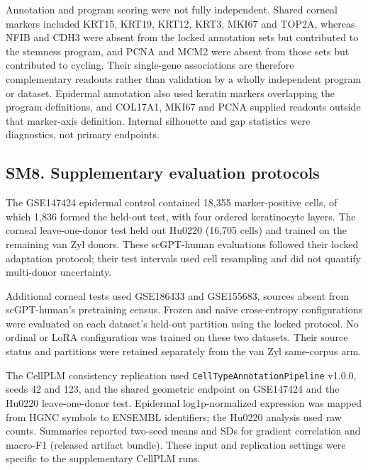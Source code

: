 \documentclass[12pt,a4paper]{article}
\begin{document}
Annotation and program scoring were not fully independent. Shared corneal markers included KRT15, KRT19, KRT12, KRT3, MKI67 and TOP2A, whereas NFIB and CDH3 were absent from the locked annotation sets but contributed to the stemness program, and PCNA and MCM2 were absent from those sets but contributed to cycling. Their single-gene associations are therefore complementary readouts rather than validation by a wholly independent program or dataset. Epidermal annotation also used keratin markers overlapping the program definitions, and COL17A1, MKI67 and PCNA supplied readouts outside that marker-axis definition. Internal silhouette and gap statistics were diagnostics, not primary endpoints.

\subsection*{SM8. Supplementary evaluation protocols}
The GSE147424 epidermal control contained 18,355 marker-positive cells, of which 1,836 formed the held-out test, with four ordered keratinocyte layers. The corneal leave-one-donor test held out Hu0220 (16,705 cells) and trained on the remaining van Zyl donors. These scGPT-human evaluations followed their locked adaptation protocol; their test intervals used cell resampling and did not quantify multi-donor uncertainty.

Additional corneal tests used GSE186433 and GSE155683, sources absent from scGPT-human's pretraining census. Frozen and naive cross-entropy configurations were evaluated on each dataset's held-out partition using the locked protocol. No ordinal or LoRA configuration was trained on these two datasets. Their source status and partitions were retained separately from the van Zyl same-corpus arm.

The CellPLM consistency replication used \texttt{CellTypeAnnotationPipeline} v1.0.0, seeds 42 and 123, and the shared geometric endpoint on GSE147424 and the Hu0220 leave-one-donor test. Epidermal log1p-normalized expression was mapped from HGNC symbols to ENSEMBL identifiers; the Hu0220 analysis used raw counts. Summaries reported two-seed means and SDs for gradient correlation and macro-F1 (released artifact bundle). These input and replication settings were specific to the supplementary CellPLM runs.
\end{document}
